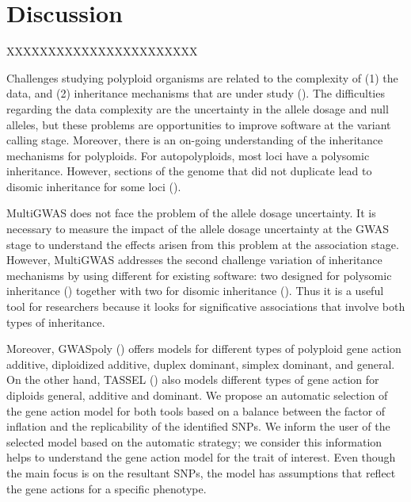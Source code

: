 \documentclass{article}
\begin{document}
\section{Discussion}

XXXXXXXXXXXXXXXXXXXXXXX

Challenges studying polyploid organisms are related to the complexity of (1) the data, and (2) inheritance mechanisms that are under study (\cite{dufresne2014}). The difficulties regarding the data complexity are the uncertainty in the allele dosage and null alleles, but these problems are opportunities to improve software at the variant calling stage.  Moreover, there is an on-going understanding of the inheritance mechanisms for polyploids. For autopolyploids, most loci have a polysomic inheritance. However, sections of the genome that did not duplicate lead to disomic inheritance for some loci (\cite{ohno1970,lynch2000,dufresne2014}). 

MultiGWAS does not face the problem of the allele dosage uncertainty.  It is necessary to measure the impact of the allele dosage uncertainty at the GWAS stage to understand the effects arisen from this problem at the association stage. However, MultiGWAS addresses the second challenge variation of inheritance mechanisms by using different for existing software: two designed for polysomic inheritance (\cite{Rosyara2016,Shen2016}) together with two for disomic inheritance (\cite{Purcell2007,Bradbury2007}). Thus it is a useful tool for researchers because it looks for significative associations that involve both types of inheritance. 

Moreover, GWASpoly (\cite{Rosyara2016}) offers models for different types of polyploid gene action additive, diploidized additive, duplex dominant, simplex dominant, and general. On the other hand, TASSEL (\cite{Bradbury2007}) also models different types of gene action for diploids general, additive and dominant. We propose an automatic selection of the gene action model for both tools based on a balance between the factor of inflation and the replicability of the identified SNPs. We inform the user of the selected model based on the automatic strategy; we consider this information helps to understand the gene action model for the trait of interest. Even though the main focus is on the resultant SNPs, the model has assumptions that reflect the gene actions for a specific phenotype.
\end{document}
